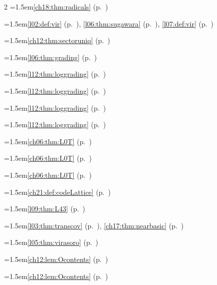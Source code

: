 \begin{multicols}{2}
\hangindent=1.5em\quad \ref{ch18:thm:radicals} (p.~\pageref{ch18:thm:radicals})\par
\par{}\par\nopagebreak\smallskip
\hangindent=1.5em\quad \ref{l02:def:vir} (p.~\pageref{l02:def:vir}), \ref{l06:thm:sugawara} (p.~\pageref{l06:thm:sugawara}), \ref{l07:def:vir} (p.~\pageref{l07:def:vir})\par
\hangindent=1.5em\quad \ref{ch12:thm:sectoruniq} (p.~\pageref{ch12:thm:sectoruniq})\par
\hangindent=1.5em\quad \ref{l06:thm:grading} (p.~\pageref{l06:thm:grading})\par
\hangindent=1.5em\quad \ref{l12:thm:loggrading} (p.~\pageref{l12:thm:loggrading})\par
\hangindent=1.5em\quad \ref{l12:thm:loggrading} (p.~\pageref{l12:thm:loggrading})\par
\hangindent=1.5em\quad \ref{l12:thm:loggrading} (p.~\pageref{l12:thm:loggrading})\par
\hangindent=1.5em\quad \ref{l12:thm:loggrading} (p.~\pageref{l12:thm:loggrading})\par
\hangindent=1.5em\quad \ref{ch06:thm:L0T} (p.~\pageref{ch06:thm:L0T})\par
\hangindent=1.5em\quad \ref{ch06:thm:L0T} (p.~\pageref{ch06:thm:L0T})\par
\hangindent=1.5em\quad \ref{ch06:thm:L0T} (p.~\pageref{ch06:thm:L0T})\par
\hangindent=1.5em\quad \ref{ch21:def:codeLattice} (p.~\pageref{ch21:def:codeLattice})\par
\hangindent=1.5em\quad \ref{l09:thm:L43} (p.~\pageref{l09:thm:L43})\par
\hangindent=1.5em\quad \ref{l03:thm:transcov} (p.~\pageref{l03:thm:transcov}), \ref{ch17:thm:nearbasic} (p.~\pageref{ch17:thm:nearbasic})\par
\hangindent=1.5em\quad \ref{l05:thm:virasoro} (p.~\pageref{l05:thm:virasoro})\par
\hangindent=1.5em\quad \ref{ch12:lem:Ocontents} (p.~\pageref{ch12:lem:Ocontents})\par
\hangindent=1.5em\quad \ref{ch12:lem:Ocontents} (p.~\pageref{ch12:lem:Ocontents})\par

\end{multicols}
